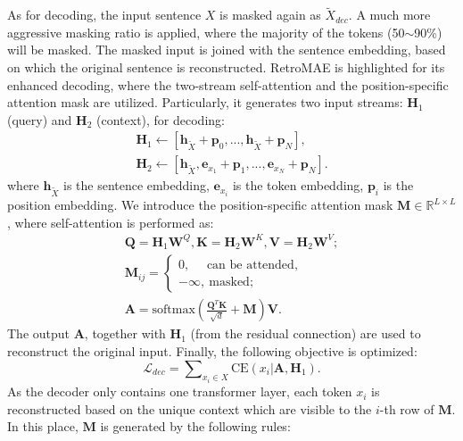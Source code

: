 \documentclass[11pt,a4paper]{article}
\begin{document}
As for decoding, the input sentence $X$ is masked again as $\tilde{X}_{dec}$. A much more aggressive masking ratio is applied, where the majority of the tokens (50$\sim$90\%) will be masked. The masked input is joined with the sentence embedding, based on which the original sentence is reconstructed. RetroMAE is highlighted for its enhanced decoding, where the two-stream self-attention and the position-specific attention mask are utilized. Particularly, it generates two input streams: $\mathbf{H}_1$ (query) and $\mathbf{H}_2$ (context), for decoding:
\begin{equation}
\begin{gathered}
\label{eq:4}
\mathbf{H}_1 \leftarrow [\mathbf{h}_{\tilde{X}} + \mathbf{p}_0,...,
\mathbf{h}_{\tilde{X}} + \mathbf{p}_N], \\
\mathbf{H}_2 \leftarrow  
[\mathbf{h}_{\tilde{X}}, \mathbf{e}_{x_1}+\mathbf{p}_1, ... , \mathbf{e}_{x_N}+\mathbf{p}_N]. 
\end{gathered}
\end{equation}
where $\mathbf{h}_{\tilde{X}}$ is the sentence embedding, $\mathbf{e}_{x_i}$ is the token embedding, $\mathbf{p}_i$ is the position embedding.
We introduce the position-specific attention mask $\mathbf{M} \in \mathbb{R}^{L \times L}$, where self-attention is performed as:
\begin{equation}\label{eq:5}
\begin{gathered}
    \mathbf{Q} = \mathbf{H}_1\mathbf{W}^Q, \mathbf{K} = \mathbf{H}_2\mathbf{W}^K, \mathbf{V} = \mathbf{H}_2\mathbf{W}^V; \\
    \mathbf{M}_{ij} = 
    \begin{cases}
    0, ~~~~~~\text{can be attended}, \\
    -\infty, ~\text{masked}; 
    \end{cases} \\
    \mathbf{A} = \mathrm{softmax}(\frac{\mathbf{Q}^T\mathbf{K}}{\sqrt{d}} + \mathbf{M
    })\mathbf{V}. 
\end{gathered}
\end{equation}
The output $\mathbf{A}$, together with $\mathbf{H}_{1}$ (from the residual connection) are used to reconstruct the original input.
Finally, the following objective is optimized: 
\begin{equation}\label{eq:6}
 \mathcal{L}_{dec} = \sum\nolimits_{x_i \in X} \mathrm{CE}(x_i|\mathbf{A}, \mathbf{H}_{1}).
\end{equation} 
As the decoder only contains one transformer layer, each token $x_i$ is reconstructed based on the unique context which are visible to the $i$-th row of $\mathbf{M}$. In this place, $\mathbf{M}$ is generated by the following rules:  
\end{document}
